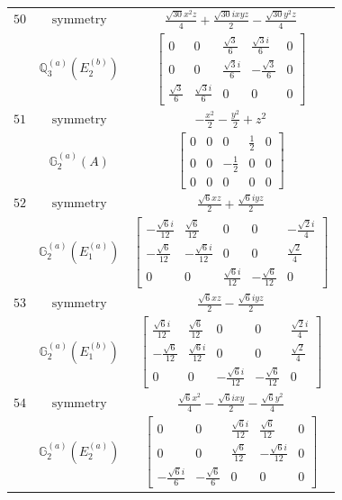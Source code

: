 \documentclass[fleqn,8pt,landscape]{jsarticle}
\begin{document}
\begin{longtable}{ccc}
$ 50 $ & $ \text{symmetry} $ & $ \frac{\sqrt{30} x^{2} z}{4} + \frac{\sqrt{30} i x y z}{2} - \frac{\sqrt{30} y^{2} z}{4} $ \\
$  $ & $ \mathbb{Q}_{3}^{(a)}(E_{2}^{(b)}) $ & $ \begin{bmatrix} 0 & 0 & \frac{\sqrt{3}}{6} & \frac{\sqrt{3} i}{6} & 0 \\ 0 & 0 & \frac{\sqrt{3} i}{6} & - \frac{\sqrt{3}}{6} & 0 \\ \frac{\sqrt{3}}{6} & \frac{\sqrt{3} i}{6} & 0 & 0 & 0 \end{bmatrix} $ \\ \hline
$ 51 $ & $ \text{symmetry} $ & $ - \frac{x^{2}}{2} - \frac{y^{2}}{2} + z^{2} $ \\
$  $ & $ \mathbb{G}_{2}^{(a)}(A) $ & $ \begin{bmatrix} 0 & 0 & 0 & \frac{1}{2} & 0 \\ 0 & 0 & - \frac{1}{2} & 0 & 0 \\ 0 & 0 & 0 & 0 & 0 \end{bmatrix} $ \\ \hline
$ 52 $ & $ \text{symmetry} $ & $ \frac{\sqrt{6} x z}{2} + \frac{\sqrt{6} i y z}{2} $ \\
$  $ & $ \mathbb{G}_{2}^{(a)}(E_{1}^{(a)}) $ & $ \begin{bmatrix} - \frac{\sqrt{6} i}{12} & \frac{\sqrt{6}}{12} & 0 & 0 & - \frac{\sqrt{2} i}{4} \\ - \frac{\sqrt{6}}{12} & - \frac{\sqrt{6} i}{12} & 0 & 0 & \frac{\sqrt{2}}{4} \\ 0 & 0 & \frac{\sqrt{6} i}{12} & - \frac{\sqrt{6}}{12} & 0 \end{bmatrix} $ \\ \hline
$ 53 $ & $ \text{symmetry} $ & $ \frac{\sqrt{6} x z}{2} - \frac{\sqrt{6} i y z}{2} $ \\
$  $ & $ \mathbb{G}_{2}^{(a)}(E_{1}^{(b)}) $ & $ \begin{bmatrix} \frac{\sqrt{6} i}{12} & \frac{\sqrt{6}}{12} & 0 & 0 & \frac{\sqrt{2} i}{4} \\ - \frac{\sqrt{6}}{12} & \frac{\sqrt{6} i}{12} & 0 & 0 & \frac{\sqrt{2}}{4} \\ 0 & 0 & - \frac{\sqrt{6} i}{12} & - \frac{\sqrt{6}}{12} & 0 \end{bmatrix} $ \\ \hline
$ 54 $ & $ \text{symmetry} $ & $ \frac{\sqrt{6} x^{2}}{4} - \frac{\sqrt{6} i x y}{2} - \frac{\sqrt{6} y^{2}}{4} $ \\
$  $ & $ \mathbb{G}_{2}^{(a)}(E_{2}^{(a)}) $ & $ \begin{bmatrix} 0 & 0 & \frac{\sqrt{6} i}{12} & \frac{\sqrt{6}}{12} & 0 \\ 0 & 0 & \frac{\sqrt{6}}{12} & - \frac{\sqrt{6} i}{12} & 0 \\ - \frac{\sqrt{6} i}{6} & - \frac{\sqrt{6}}{6} & 0 & 0 & 0 \end{bmatrix} $ \\ \hline

\end{longtable}
\end{document}
